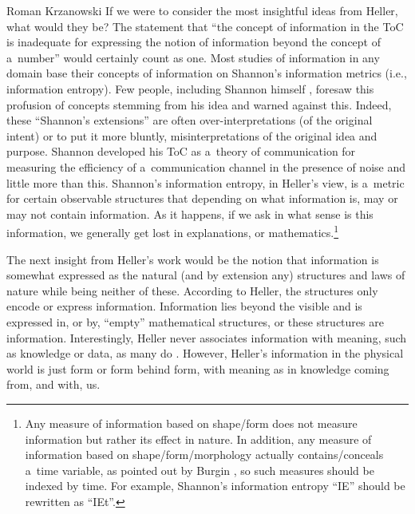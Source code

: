 \begin{artengenv}{Roman Krzanowski}
If we were to consider the most insightful ideas from Heller, what would they be? The statement that ``the concept of information in the ToC is inadequate for expressing the notion of information beyond the concept of a~number'' would certainly count as one. Most studies of information in any domain base their concepts of information on Shannon's information metrics (i.e., information entropy). Few people, including Shannon himself 
\parencite[][]{shannon_bandwagon_1956}, %
 foresaw this profusion of concepts stemming from his idea and warned against this. Indeed, these ``Shannon's extensions'' are often over-interpretations (of the original intent) or to put it more bluntly, misinterpretations of the original idea and purpose. Shannon developed his ToC as a~theory of communication for measuring the efficiency of a~communication channel in the presence of noise and little more than this. Shannon's information entropy, in Heller's view, is a~metric for certain observable structures that depending on what information is, may or may not contain information. As it happens, if we ask in what sense is this information, we generally get lost in explanations, or mathematics.\footnote{Any measure of information based on shape/form does not measure information but rather its effect in nature. In addition, any measure of information based on shape/form/morphology actually contains/conceals a~time variable, as pointed out by Burgin 
\parencite*[][]{burgin_theory_2010}, %
 so such measures should be indexed by time. For example, Shannon's information entropy ``IE'' should be rewritten as ``IEt''.}



The next insight from Heller's work would be the notion that information is somewhat expressed as the natural (and by extension any) structures and laws of nature while being neither of these. According to Heller, the structures only encode or express information. Information lies beyond the visible and is expressed in, or by, ``empty'' mathematical structures, or these structures are information. Interestingly, Heller never associates information with meaning, such as knowledge or data, as many do 
\parencites[e.g.,][]{losee_discipline_1997}[][]{sveiby_what_1998}[][]{casagrande_information_1999}[][]{dretske_knowledge_1999}[][]{floridi_information_2010}[][]{floridi_philosophy_2011}[][]{floridi_semantic_2019}[][]{lenski_information_2010}[][]{vernon_artificial_2014}. %
 However, Heller's information in the physical world is just form or form behind form, with meaning as in knowledge coming from, and with, us.




\end{artengenv}
